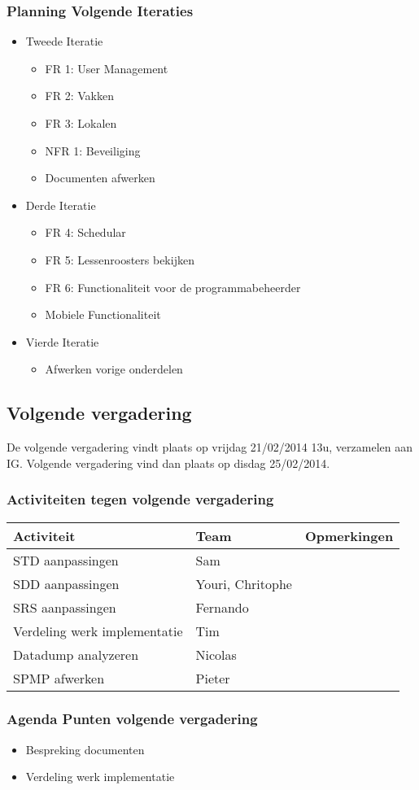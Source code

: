 \subsubsection{Planning Volgende Iteraties}
\begin{itemize}
	\item
	{
		Tweede Iteratie
		\begin{itemize}
			\item FR 1: User Management
			\item FR 2: Vakken
			\item FR 3: Lokalen
			\item NFR 1: Beveiliging
			\item Documenten afwerken
		\end{itemize}
	}
	\item
	{
		Derde Iteratie
		\begin{itemize}
			\item FR 4: Schedular
			\item FR 5: Lessenroosters bekijken
			\item FR 6: Functionaliteit voor de programmabeheerder
			\item Mobiele Functionaliteit
		\end{itemize}
	}
	\item
	{
		Vierde Iteratie
		\begin{itemize}
			\item Afwerken vorige onderdelen
		\end{itemize}
	}
\end{itemize}

\subsection{Volgende vergadering}
De volgende vergadering vindt plaats op vrijdag 21/02/2014 13u, verzamelen aan IG.
Volgende vergadering vind dan plaats op disdag 25/02/2014.
\subsubsection{Activiteiten tegen volgende vergadering} \label{sec:TODOActiviteiten}
\begin{table} [H]
	\centering
	\begin{tabular} {l|l|l}
		\textbf{Activiteit} & \textbf{Team} & \textbf{Opmerkingen} \\
		\hline
		 STD aanpassingen & Sam  & \\
		 SDD aanpassingen & Youri, Chritophe & \\
		 SRS aanpassingen & Fernando & \\
		 Verdeling werk implementatie & Tim & \\
		 Datadump analyzeren & Nicolas & \\ 
		 SPMP afwerken & Pieter & \\
	\end{tabular}
\end{table}

\subsubsection{Agenda Punten volgende vergadering}
\begin{itemize}
	\item Bespreking documenten
	\item Verdeling werk implementatie
\end{itemize}